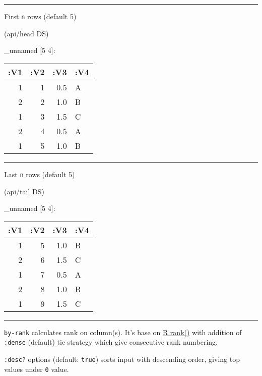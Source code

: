 \documentclass[]{article}
\newenvironment{Shaded}{\begin{snugshade}}{\end{snugshade}}
\newcommand{\NormalTok}[1]{#1}
\begin{document}
\begin{center}\rule{0.5\linewidth}{0.5pt}\end{center}

First \texttt{n} rows (default 5)

\begin{Shaded}
\begin{Highlighting}[]
\NormalTok{(api/head DS)}
\end{Highlighting}
\end{Shaded}

\_unnamed {[}5 4{]}:

\begin{longtable}[]{@{}rrrl@{}}
\toprule
:V1 & :V2 & :V3 & :V4\tabularnewline
\midrule
\endhead
1 & 1 & 0.5 & A\tabularnewline
2 & 2 & 1.0 & B\tabularnewline
1 & 3 & 1.5 & C\tabularnewline
2 & 4 & 0.5 & A\tabularnewline
1 & 5 & 1.0 & B\tabularnewline
\bottomrule
\end{longtable}

\begin{center}\rule{0.5\linewidth}{0.5pt}\end{center}

Last \texttt{n} rows (default 5)

\begin{Shaded}
\begin{Highlighting}[]
\NormalTok{(api/tail DS)}
\end{Highlighting}
\end{Shaded}

\_unnamed {[}5 4{]}:

\begin{longtable}[]{@{}rrrl@{}}
\toprule
:V1 & :V2 & :V3 & :V4\tabularnewline
\midrule
\endhead
1 & 5 & 1.0 & B\tabularnewline
2 & 6 & 1.5 & C\tabularnewline
1 & 7 & 0.5 & A\tabularnewline
2 & 8 & 1.0 & B\tabularnewline
1 & 9 & 1.5 & C\tabularnewline
\bottomrule
\end{longtable}

\begin{center}\rule{0.5\linewidth}{0.5pt}\end{center}

\texttt{by-rank} calculates rank on column(s). It's base on
\href{https://www.rdocumentation.org/packages/base/versions/3.6.1/topics/rank}{R
rank()} with addition of \texttt{:dense} (default) tie strategy which
give consecutive rank numbering.

\texttt{:desc?} options (default: \texttt{true}) sorts input with
descending order, giving top values under \texttt{0} value.
\end{document}
